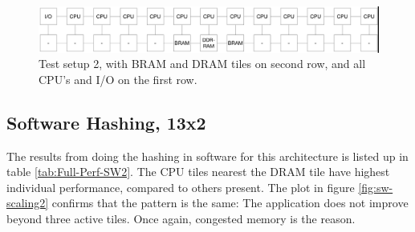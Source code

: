\begin{appendix}
\begin{figure}[htb]
    \centering
    \includegraphics[width=1.0\textwidth]{Figures/Measurements/13x2}
    \caption{Test setup 2, with BRAM and DRAM tiles on second row, and all CPU's and I/O on the first row.}
    \label{fig:13x2-2}
\end{figure}

\subsection{Software Hashing, 13x2}

The results from doing the hashing in software for this architecture is listed up in table \ref{tab:Full-Perf-SW2}. 
The CPU tiles nearest the DRAM tile have highest individual performance, compared to others present.
The plot in figure \ref{fig:sw-scaling2} confirms that the pattern is the same: The application does not improve beyond three active tiles.
Once again, congested memory is the reason.





\end{appendix}
